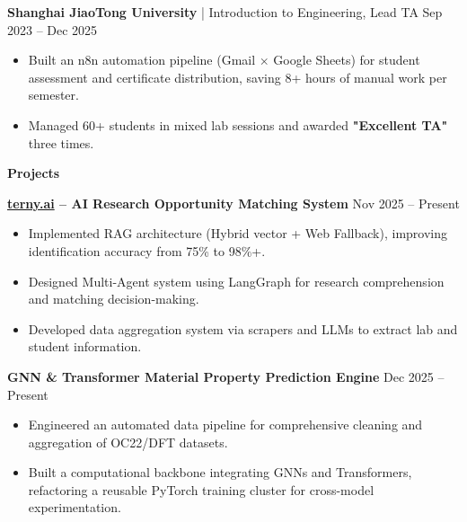\documentclass[11pt]{article}
\begin{document}
\vspace{0pt}
\textbf{Shanghai JiaoTong University} | Introduction to Engineering, Lead TA \hfill Sep 2023 -- Dec 2025  
\begin{itemize}[itemsep=0pt, parsep=0pt, topsep=0pt, partopsep=0pt, leftmargin=15pt]
    \item Built an n8n automation pipeline (Gmail $\times$ Google Sheets) for student assessment and certificate distribution, saving 8+ hours of manual work per semester.
    \item Managed 60+ students in mixed lab sessions and awarded \textbf{"Excellent TA"} three times.
\end{itemize}

\vspace{-5pt}
\begin{center}
    \textbf{Projects} \\
    \vspace{-5pt}
    \hrulefill
\end{center}
\vspace{-5pt}

\textbf{\href{https://terny.ai/}{terny.ai} -- AI Research Opportunity Matching System} \hfill Nov 2025 -- Present  
\begin{itemize}[itemsep=0pt, parsep=0pt, topsep=0pt, partopsep=0pt, leftmargin=15pt]
    \item Implemented RAG architecture (Hybrid vector + Web Fallback), improving identification accuracy from 75\% to 98\%+.
    \item Designed Multi-Agent system using LangGraph for research comprehension and matching decision-making.
    \item Developed data aggregation system via scrapers and LLMs to extract lab and student information.
\end{itemize}

\vspace{2pt}
\textbf{GNN \& Transformer Material Property Prediction Engine} \hfill Dec 2025 -- Present  
\begin{itemize}[itemsep=0pt, parsep=0pt, topsep=1pt, partopsep=0pt, leftmargin=15pt]
    \item Engineered an automated data pipeline for comprehensive cleaning and aggregation of OC22/DFT datasets.
    \item Built a computational backbone integrating GNNs and Transformers, refactoring a reusable PyTorch training cluster for cross-model experimentation.
\end{itemize}
\end{document}
